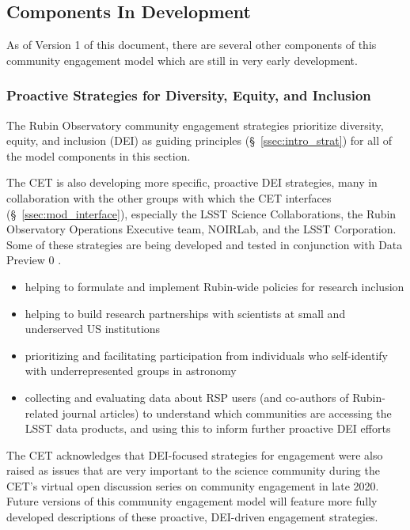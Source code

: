 \documentclass[DM,lsstdraft,toc]{lsstdoc}
\begin{document}
\subsection{Components In Development}\label{ssec:mod_dev}

As of Version 1 of this document, there are several other components of this community engagement model which are still in very early development.


\subsubsection{Proactive Strategies for Diversity, Equity, and Inclusion}\label{sssec:mod_dev_proact}

The Rubin Observatory community engagement strategies prioritize diversity, equity, and inclusion (DEI) as guiding principles (\S~\ref{ssec:intro_strat}) for all of the model components in this section.

The CET is also developing more specific, proactive DEI strategies, many in collaboration with the other groups with which the CET interfaces (\S~\ref{ssec:mod_interface}), especially the LSST Science Collaborations, the Rubin Observatory Operations Executive team, NOIRLab, and the LSST Corporation.
Some of these strategies are being developed and tested in conjunction with Data Preview 0 .

\begin{itemize}
\item helping to formulate and implement Rubin-wide policies for research inclusion
\item helping to build research partnerships with scientists at small and underserved US institutions
\item prioritizing and facilitating participation from individuals who self-identify with underrepresented groups in astronomy
\item collecting and evaluating data about RSP users (and co-authors of Rubin-related journal articles) to understand which communities are accessing the LSST data products, and using this to inform further proactive DEI efforts
\end{itemize}

The CET acknowledges that DEI-focused strategies for engagement were also raised as issues that are very important to the science community during the CET's virtual open discussion series on community engagement in late 2020.
Future versions of this community engagement model will feature more fully developed descriptions of these proactive, DEI-driven engagement strategies.
\end{document}
